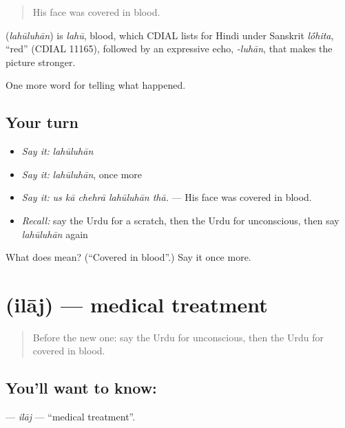 \begin{quote}
His face was covered in blood.
\end{quote}

\begin{cousinweb}
\textbf{} (\emph{lahūluhān}) is \emph{lahū}, blood, which CDIAL lists for Hindi under Sanskrit \emph{l\'{\={o}}hita}, \textquotedblleft{}red\textquotedblright{} (CDIAL 11165), followed by an expressive echo, \emph{-luhān}, that makes the picture stronger.
\end{cousinweb}

\begin{grammarlens}[title={What you've built}]
One more word for telling what happened.
\end{grammarlens}

\subsection*{Your turn}
\begin{itemize}
\raggedright
  \item \emph{Say it:} \emph{lahūluhān}
  \item \emph{Say it:} \emph{lahūluhān}, once more
  \item \emph{Say it:} \emph{us kā chehrā lahūluhān thā.} — His face was covered in blood.
  \item \emph{Recall:} say the Urdu for a scratch, then the Urdu for unconscious, then say \emph{lahūluhān} again
\end{itemize}

\begin{tcolorbox}[breakable,colback=teal!4,colframe=teal!35!black,title={Before you move on}]
What does  mean? (\textquotedblleft{}Covered in blood\textquotedblright{}.) Say it once more.
\end{tcolorbox}
\section[\texorpdfstring{\ur{علاج} (ilāj)}{علاج (ilāj)}]{ (ilāj) — medical treatment}

\label{lesson:UR-C286-ilaj}



\begin{quote}
Before the new one: say the Urdu for unconscious, then the Urdu for covered in blood.
\end{quote}

\subsection*{You'll want to know: }
\textbf{} — \emph{ilāj} — \textquotedblleft{}medical treatment\textquotedblright{}.

